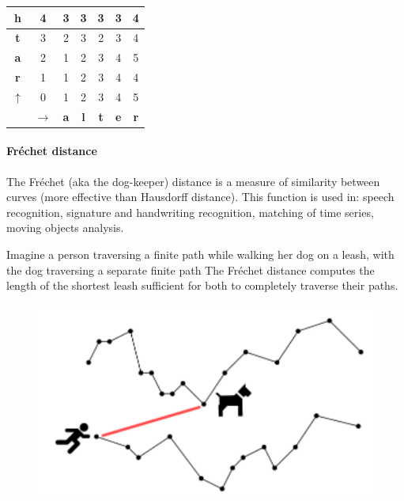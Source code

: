 \begin{example}
\begin{table}[H]
\begin{tabular}{c|c|c|c|c|c|c|}
        \multicolumn{1}{|c|}{\textbf{h}}          & 4                      & 3          & 3          & 3          & 3          & 4          \\ \hline
        \multicolumn{1}{|c|}{\textbf{t}}          & 3                      & 2          & 3          & 2          & 3          & 4          \\ \hline
        \multicolumn{1}{|c|}{\textbf{a}}          & 2                      & 1          & 2          & 3          & 4          & 5          \\ \hline
        \multicolumn{1}{|c|}{\textbf{r}}          & 1                      & 1          & 2          & 3          & 4          & 4          \\ \hline
        \multicolumn{1}{|c|}{$\uparrow$}          & 0                      & 1          & 2          & 3          & 4          & 5          \\ \hline
                                                  & $\rightarrow$          & \textbf{a} & \textbf{l} & \textbf{t} & \textbf{e} & \textbf{r} \\ \cline{2-7} 
        \end{tabular}
    \end{table}
\end{example}

\paragraph*{Fréchet distance}
The Fréchet (aka the dog-keeper) distance is a measure of similarity between curves (more effective than Hausdorff distance). 
This function is used in: speech recognition, signature and handwriting recognition, matching of time series, moving objects analysis. 

Imagine a person traversing a finite path while walking her dog on a leash, with the dog traversing a separate finite path 
The Fréchet distance computes the length of the shortest leash sufficient for both to completely traverse their paths. 
\begin{figure}[H]
    \centering
    \includegraphics[width=0.5\linewidth]{images/fd.png}
\end{figure}

